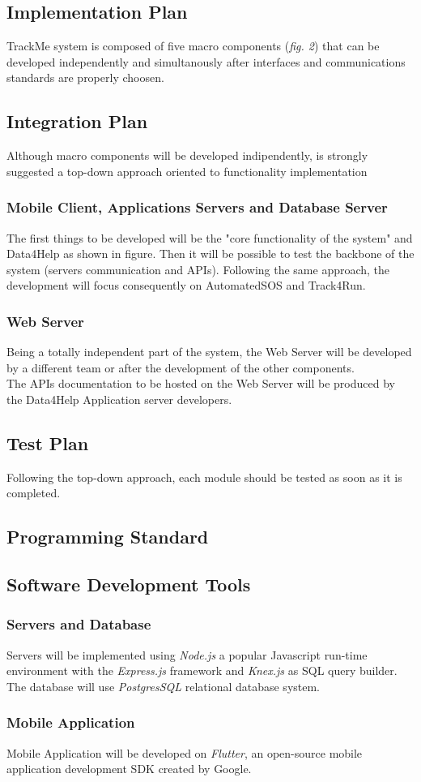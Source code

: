 \documentclass[../main.tex]{subfiles}
\begin{document}
\subsection{Implementation Plan}
TrackMe system is composed of five macro components (\textit{fig. 2}) that can be developed independently and simultanously
after interfaces and communications standards are properly choosen.\\



\subsection{Integration Plan}
Although macro components will be developed indipendently, is strongly suggested a top-down approach oriented to functionality
implementation
 \subsubsection{Mobile Client, Applications Servers and Database Server}
    The first things to be developed will be the "core functionality of the system" and Data4Help as shown in figure. Then it will be possible
    to test the backbone of the system (servers communication and APIs). Following the same approach, the development will focus consequently on
    AutomatedSOS and Track4Run.
 \subsubsection{Web Server}
    Being a totally independent part of the system, the Web Server will be developed by a different team or after the development of the other components.\\
    The APIs documentation to be hosted on the Web Server will be produced by the Data4Help Application server developers. 
\subsection{Test Plan}
    Following the top-down approach, each module should be tested as soon as it is completed.
\subsection{Programming Standard}
\subsection{Software Development Tools}
\subsubsection{Servers and Database}
Servers will be implemented using \textit{Node.js} a popular Javascript run-time environment with the \textit{Express.js} framework and \textit{Knex.js} as SQL query builder.\\
The database will use \textit{PostgresSQL} relational database system.
\subsubsection{Mobile Application}
Mobile Application will be developed on \textit{Flutter}, an open-source mobile application development SDK created by Google.
\end{document}
